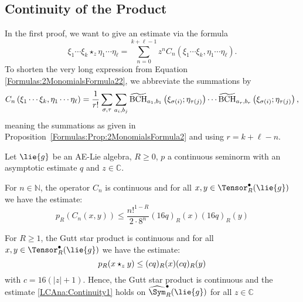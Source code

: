 \subsection{Continuity of the Product}
In the first proof, we want to give an estimate via the formula
\begin{equation}
    \label{eq:GstarOfXisAndEtas}
    \xi_1 \cdots \xi_k \star_z \eta_1 \cdots \eta_{\ell}
    =
    \sum\limits_{n=0}^{k + \ell -1}
    z^n
    C_n (\xi_1 \cdots \xi_k, \eta_1 \cdots \eta_{\ell}).
\end{equation}
To shorten the very long expression from Equation 
\eqref{Formulas:2MonomialsFormula22}, we abbreviate the summations by
\begin{equation}
	\label{LCAna:ShorterSumsInLongProduct}
    C_n\left(
        \xi_1 \cdots \xi_k,
        \eta_1 \cdots \eta_{\ell}
    \right)
    =
    \frac{1}{r!}
    \sum\limits_{\sigma, \tau}
    \sum\limits_{a_i, b_j}
    \widetilde{\mathrm{BCH}}_{a_1, b_1}\left(\xi_{\sigma(i)}; \eta_{\tau(j)}\right)
    \cdots
    \widetilde{\mathrm{BCH}}_{a_r, b_r}\left(\xi_{\sigma(i)}; \eta_{\tau(j)}\right),
\end{equation}
meaning the summations as given in
Proposition~\ref{Formulas:Prop:2MonomialsFormula2} and 
using $r = k + \ell - n$.
\begin{theorem}
    \label{Thm:LCAna:Continuity1}%
    Let $\lie{g}$ be an AE-Lie algebra, $R \geq 0$, $p$ a continuous seminorm
    with an asymptotic estimate $q$ and $z \in \mathbb{C}$.
    \begin{theoremlist}
    	\item \label{item:CnOperatorEstimate}
    	For $n \in \mathbb{N}$, the operator $C_n$ is continuous and for all
    	$x, y \in \Tensor_R^{\bullet}(\lie{g})$ we have the estimate:
    	\begin{equation}
    		\label{LCAna:CnOperators}
    		p_R \left( C_n(x,y) \right)
			\leq
        	\frac{n!^{1 - R}}{2 \cdot 8^n}
        	(16 q)_R (x)
        	(16 q)_R (y)
    	\end{equation}
    	\item \label{item:LCAna:Continuity1}
    	For $R \geq 1$, the Gutt star product is continuous and for all
    	$x, y \in \Tensor_R^{\bullet}(\lie{g})$ we have the estimate:
	    \begin{equation}
	   	    \label{LCAna:Continuity1}
	        p_R(x \star_z y)
	        \leq
	        (c q)_R(x) (c q)_R(y)
	    \end{equation}
	    with $c = 16(|z| + 1)$. Hence, the Gutt star product is continuous and
	    the estimate \eqref{LCAna:Continuity1} holds on
	    $\widehat{\Sym}_R^\bullet(\lie{g})$ for all $z \in \mathbb{C}$
	\end{theoremlist}
\end{theorem}
